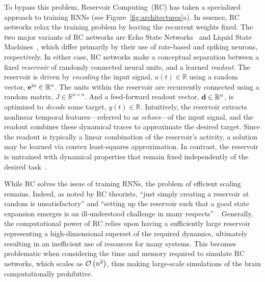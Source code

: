 To bypass this problem, Reservoir Computing~(RC) has taken a specialized approach to training RNNs (see Figure~\ref{fig:architectures}a).
In essence, RC networks relax the training problem by leaving the recurrent weights fixed.
The two major variants of RC networks are Echo State Networks~\citep[ESNs;][]{jaeger2001echo} and Liquid State Machines~\citep[LSMs;][]{maass2002real}, which differ primarily by their use of rate-based and spiking neurons, respectively.
In either case, RC networks make a conceptual separation between a fixed {\it reservoir} of randomly connected neural units, and a learned {\it readout}.
The reservoir is driven by {\it encoding} the input signal, $u(t) \in \mathbb{R}$ using a random vector, $\mathbf{e}^\text{in} \in \mathbb{R}^n$.
The units within the reservoir are recurrently connected using a random matrix, $J \in \mathbb{R}^{n \times n}$.
And a feed-forward readout vector, $\mathbf{d} \in \mathbb{R}^{n}$, is optimized to {\it decode} some target, $y(t) \in \mathbb{R}$.
Intuitively, the reservoir extracts nonlinear temporal features---referred to as {\it echoes}---of the input signal, and the readout combines these dynamical traces to approximate the desired target.
Since the readout is typically a linear combination of the reservoir's activity, a solution may be learned via convex least-squares approximation.
In contrast, the reservoir is untrained with dynamical properties that remain fixed independently of the desired task~\citep{lukovsevicius2012reservoir}.

While RC solves the issue of training RNNs, the problem of efficient scaling remains. 
Indeed, as noted by RC theorists, ``just simply creating a reservoir at random is unsatisfactory'' and ``setting up the reservoir such that a good state expansion emerges is an ill-understood challenge in many respects''~\citep{lukovsevicius2012reservoir}.
Generally, the computational power of RC relies upon having a sufficiently large reservoir representing a high-dimensional superset of the required dynamics, ultimately resulting in an inefficient use of resources for many systems.
This becomes problematic when considering the time and memory required to simulate RC networks, which scales as $\mathcal{O}\left({ n^2 }\right)$, thus making large-scale simulations of the brain computationally prohibitive.

